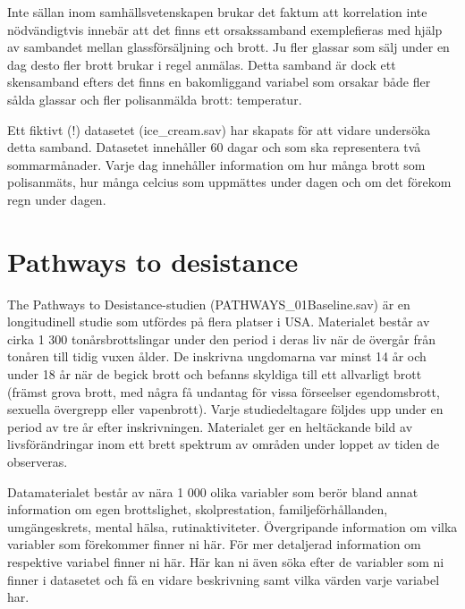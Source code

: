 \documentclass[
]{book}
\begin{document}
Inte sällan inom samhällsvetenskapen brukar det faktum att korrelation inte nödvändigtvis innebär att det finns ett orsakssamband exemplefieras med hjälp av sambandet mellan glassförsäljning och brott. Ju fler glassar som sälj under en dag desto fler brott brukar i regel anmälas. Detta samband är dock ett skensamband efters det finns en bakomliggand variabel som orsakar både fler sålda glassar och fler polisanmälda brott: temperatur.

Ett fiktivt (!) datasetet (ice\_cream.sav) har skapats för att vidare undersöka detta samband. Datasetet innehåller 60 dagar och som ska representera två sommarmånader. Varje dag innehåller information om hur många brott som polisanmäts, hur många celcius som uppmättes under dagen och om det förekom regn under dagen.

\hypertarget{pathways-to-desistance}{%
\section{Pathways to desistance}\label{pathways-to-desistance}}

The Pathways to Desistance-studien (PATHWAYS\_01Baseline.sav) är en longitudinell studie som utfördes på flera platser i USA. Materialet består av cirka 1 300 tonårsbrottslingar under den period i deras liv när de övergår från tonåren till tidig vuxen ålder. De inskrivna ungdomarna var minst 14 år och under 18 år när de begick brott och befanns skyldiga till ett allvarligt brott (främst grova brott, med några få undantag för vissa förseelser egendomsbrott, sexuella övergrepp eller vapenbrott). Varje studiedeltagare följdes upp under en period av tre år efter inskrivningen. Materialet ger en heltäckande bild av livsförändringar inom ett brett spektrum av områden under loppet av tiden de observeras.

Datamaterialet består av nära 1 000 olika variabler som berör bland annat information om egen brottslighet, skolprestation, familjeförhållanden, umgängeskrets, mental hälsa, rutinaktiviteter. Övergripande information om vilka variabler som förekommer finner ni här. För mer detaljerad information om respektive variabel finner ni här. Här kan ni även söka efter de variabler som ni finner i datasetet och få en vidare beskrivning samt vilka värden varje variabel har.

  
\end{document}
